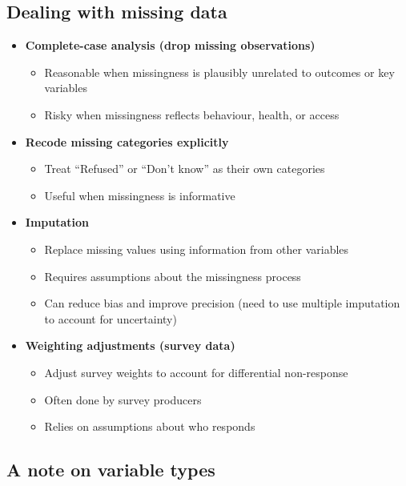 \documentclass[
  letterpaper,
  DIV=11,
  numbers=noendperiod]{scrartcl}
\providecommand{\tightlist}{%
  \setlength{\itemsep}{0pt}\setlength{\parskip}{0pt}}
\begin{document}
\subsection{Dealing with missing data}\label{dealing-with-missing-data}

\begin{itemize}
\tightlist
\item
  \textbf{Complete-case analysis (drop missing observations)}

  \begin{itemize}
  \tightlist
  \item
    Reasonable when missingness is plausibly unrelated to outcomes or
    key variables
  \item
    Risky when missingness reflects behaviour, health, or access
  \end{itemize}
\item
  \textbf{Recode missing categories explicitly}

  \begin{itemize}
  \tightlist
  \item
    Treat ``Refused'' or ``Don't know'' as their own categories
  \item
    Useful when missingness is informative
  \end{itemize}
\item
  \textbf{Imputation}

  \begin{itemize}
  \tightlist
  \item
    Replace missing values using information from other variables
  \item
    Requires assumptions about the missingness process
  \item
    Can reduce bias and improve precision (need to use multiple
    imputation to account for uncertainty)
  \end{itemize}
\item
  \textbf{Weighting adjustments (survey data)}

  \begin{itemize}
  \tightlist
  \item
    Adjust survey weights to account for differential non-response
  \item
    Often done by survey producers
  \item
    Relies on assumptions about who responds
  \end{itemize}
\end{itemize}

\subsection{A note on variable types}\label{a-note-on-variable-types}
\end{document}
